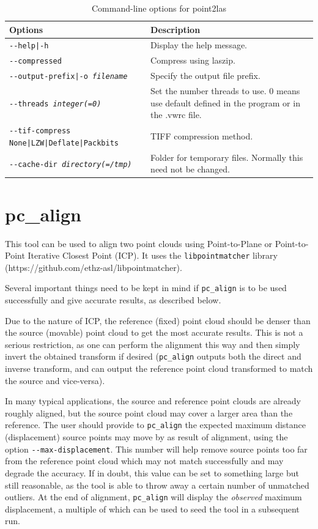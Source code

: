 \begin{longtable}{|l|p{10cm}|}
\caption{Command-line options for point2las}
\label{tbl:point2las}
\endfirsthead
\endhead
\endfoot
\endlastfoot
\hline
Options & Description \\ \hline \hline
\texttt{-\/-help|-h} & Display the help message.\\ \hline
\texttt{-\/-compressed} &
Compress using laszip. \\ \hline
\texttt{-\/-output-prefix|-o \textit{filename}} & Specify the output file prefix. \\ \hline
\texttt{-\/-threads \textit{integer(=0)}} & Set the number threads to use. 0 means use default defined in the program or in the .vwrc file.\\ \hline
\texttt{-\/-tif-compress None|LZW|Deflate|Packbits} & TIFF compression method.\\ \hline
\texttt{-\/-cache-dir \textit{directory(=/tmp)}} & Folder for temporary files. Normally this need not be changed.\\ \hline
\end{longtable}

\section{pc\_align}
\label{pcalign}

This tool can be used to align two point clouds using Point-to-Plane or
Point-to-Point Iterative Closest Point (ICP). It uses the
\texttt{libpointmatcher} library~\cite{Pomerleau12comp}
(https://github.com/ethz-asl/libpointmatcher).

Several important things need to be kept in mind if \texttt{pc\_align} is to be
used successfully and give accurate results, as described below.

Due to the nature of ICP, the reference (fixed) point cloud should be
denser than the source (movable) point cloud to get the most accurate
results. This is not a serious restriction, as one can perform the
alignment this way and then simply invert the obtained transform if
desired (\texttt{pc\_align} outputs both the direct and inverse
transform, and can output the reference point cloud transformed to match
the source and vice-versa).

In many typical applications, the source and reference point clouds are
already roughly aligned, but the source point cloud may cover a larger
area than the reference. The user should provide to \texttt{pc\_align}
the expected maximum distance (displacement) source points may move by
as result of alignment, using the option
\texttt{-\/-max-displacement}. This number will help remove source
points too far from the reference point cloud which may not match
successfully and may degrade the accuracy. If in doubt, this value can
be set to something large but still reasonable, as the tool is able to
throw away a certain number of unmatched outliers. At the end of
alignment, \texttt{pc\_align} will display the {\it observed} maximum
displacement, a multiple of which can be used to seed the tool in a
subsequent run.

